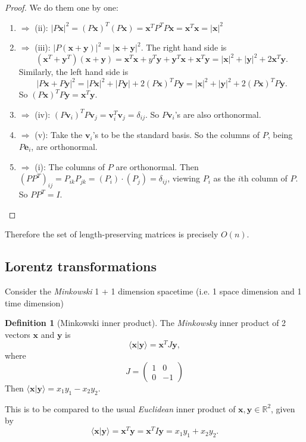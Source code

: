 \documentclass[a4paper]{article}
\theoremstyle{definition}
\newtheorem*{defi}{Definition}
\newcommand{\mb}[1]{\mathbf{#1}}
\newcommand{\bra}{\langle}
\newcommand{\ket}{\rangle}
\newcommand{\R}{\mathbb{R}}
\begin{document}
\begin{proof}
  We do them one by one:
  \begin{enumerate}
  \item $\Rightarrow$ (ii): $|P\mb{x}|^2 = (P\mb{x})^T(P\mb{x}) = \mb{x}^TP^TP\mb{x} = \mb{x}^T\mb{x} = |\mb{x}|^2$
  \item $\Rightarrow$ (iii): $|P(\mb{x} + \mb{y})|^2 = |\mb{x + y}|^2$. The right hand side is
    \[
    (\mb{x}^T + \mb{y}^T)(\mb{x + y}) = \mb{x}^T\mb{x} + y^T\mb{y} + \mb{y}^T\mb{x} + \mb{x}^T\mb{y} = |\mb{x}|^2 + |\mb{y}|^2  + 2\mb{x}^T\mb{y}.
    \]
    Similarly, the left hand side is
    \[
    |P\mb{x} + P\mb{y}|^2 = |P\mb{x}|^2 + |P\mb{y}| + 2(P\mb{x})^TP\mb{y} = |\mb{x}|^2 + |\mb{y}|^2 + 2(P\mb{x})^TP\mb{y}.
    \]
    So $(P\mb{x})^TP\mb{y} = \mb{x}^T\mb{y}$.
  \item $\Rightarrow$ (iv): $(P\mb{v}_i)^TP\mb{v}_j = \mb{v}_i^T\mb{v}_j = \delta_{ij}$. So $P\mb{v}_i$'s are also orthonormal.
  \item $\Rightarrow$ (v): Take the $\mb{v}_i$'s to be the standard basis. So the columns of $P$, being $P\mb{e}_i$, are orthonormal.
  \item $\Rightarrow$ (i): The columns of $P$ are orthonormal. Then $(PP^T)_{ij} = P_{ik}P_{jk} = (P_i)\cdot (P_j) = \delta_{ij}$, viewing $P_i$ as the $i$th column of $P$. So $PP^T = I$.
  \end{enumerate}
\end{proof}

Therefore the set of length-preserving matrices is precisely $O(n)$.

\subsection{Lorentz transformations}
Consider the \emph{Minkowski} 1 + 1 dimension spacetime (i.e. 1 space dimension and 1 time dimension)

\begin{defi}[Minkowski inner product]
  The \emph{Minkowsky} inner product of 2 vectors $\mb{x}$ and $\mb{y}$ is
  \[
  \bra \mb{x}|\mb{y}\ket = \mb{x}^TJ\mb{y},
  \]
  where
  \[
  J = 
  \begin{pmatrix}
    1 & 0\\
    0 & -1
  \end{pmatrix}
  \]
  Then $\bra \mb{x}|\mb{y}\ket = x_1y_1 - x_2y_2$.
\end{defi}
This is to be compared to the usual \emph{Euclidean} inner product of $\mb{x}, \mb{y}\in \R^2$, given by
\[
\bra \mb{x}|\mb{y}\ket = \mb{x}^T\mb{y} = \mb{x}^TI\mb{y} = x_1y_1 + x_2y_2.
\]
\end{document}
